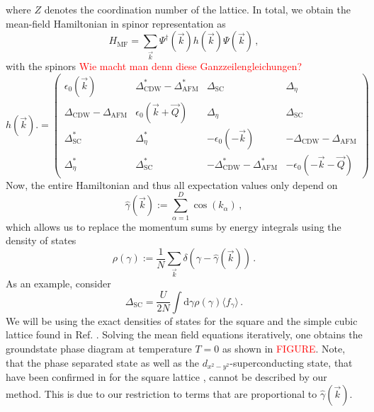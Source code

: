 \documentclass[iicol,sn-mathphys,Numbered]{sn-jnl}%
\theoremstyle{thmstyleone}%
\theoremstyle{thmstyletwo}%
\theoremstyle{thmstylethree}%
\begin{document}
where $Z$ denotes the coordination number of the lattice.
In total, we obtain the mean-field Hamiltonian in spinor representation as
\begin{equation}
    H_\text{MF} = \sum_{\vec{k}} \Psi^\dagger (\vec{k}) h(\vec{k}) \Psi (\vec{k})\,,
\end{equation}
with the spinors \textcolor{red}{Wie macht man denn diese Ganzzeilengleichungen?}
\begin{equation}
    h(\vec{k}) .= \begin{pmatrix}
        \epsilon_0 (\vec{k}) & \Delta_\text{CDW}^* - \Delta_\text{AFM}^* & \Delta_\text{SC} & \Delta_\eta \\
        \Delta_\text{CDW} - \Delta_\text{AFM} & \epsilon_0 (\vec{k} + \vec{Q}) & \Delta_\eta & \Delta_\text{SC} \\
        \Delta_\text{SC}^* & \Delta_\eta^* & - \epsilon_0 (-\vec{k}) & - \Delta_\text{CDW} - \Delta_\text{AFM} \\
        \Delta_\eta^* & \Delta_\text{SC}^* & - \Delta_\text{CDW}^* - \Delta_\text{AFM}^* & - \epsilon_0 (-\vec{k} - \vec{Q})
        \end{pmatrix}
\end{equation}
Now, the entire Hamiltonian and thus all expectation values only depend on
\begin{equation}
    \hat{\gamma}(\vec{k}) := \sum_{\alpha=1}^D \cos(k_\alpha)\,,
\end{equation}
which allows us to replace the momentum sums by energy integrals using the density of states
\begin{equation}
    \rho(\gamma) := \frac{1}{N} \sum_{\vec{k}} \delta \left(\gamma - \hat{\gamma} (\vec{k}) \right)\,.
\end{equation}
As an example, consider 
\begin{equation}
    \Delta_\text{SC} = \frac{U}{2N} \int \mathrm{d}\gamma \rho(\gamma) \langle f_{\gamma} \rangle\,.
\end{equation}
We will be using the exact densities of states for the square and the simple cubic lattice found in Ref. \cite{Hanisch97}.
Solving the mean field equations iteratively, one obtains the groundstate phase diagram at temperature $T=0$ as shown in \textcolor{red}{FIGURE}.
Note, that the phase separated state as well as the $d_{x^2 - y^2}$-superconducting state, that have been confirmed in for the square lattice \cite{Micnas88b,Huang13},
cannot be described by our method. This is due to our restriction to terms that are proportional to $\hat{\gamma}(\vec{k})$.
\end{document}
